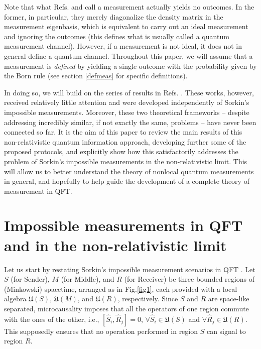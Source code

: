 \documentclass[12pt]{article}
\begin{document}
Note that what Refs. \cite{beckman2001causal} and \cite{fewster2020quantum} call a measurement actually yields no outcomes. In the former, in particular, they merely diagonalize the density matrix in the measurement eigenbasis, which is equivalent to carry out an ideal measurement and ignoring the outcomes (this defines what is usually called a quantum measurement channel). However, if a measurement is not ideal, it does not in general define a quantum channel. Throughout this paper, we will assume that a measurement is \textit{defined} by yielding a single outcome with the probability given by the Born rule (see section \ref{defmeas} for specific definitions).

In doing so, we will build on the series of results in Refs. \cite{aharonov1986measurement, popescu1994causality, groisman2001nonlocal, groisman2002measurements, vaidman2003instantaneous}. These works,  however, received relatively little attention and were developed independently of Sorkin's impossible measurements. Moreover, these two theoretical frameworks -- despite addressing incredibly similar, if not exactly the same, problems -- have never been connected so far.
It is the aim of this paper to review the main results of this non-relativistic quantum information approach, developing further some of the proposed protocols, and  explicitly show how this satisfactorily addresses the problem of Sorkin's impossible measurements in the non-relativistic limit. This will allow us to better understand the theory of nonlocal quantum measurements in general, and hopefully to help guide the development of a complete theory of measurement in QFT. 







\section{Impossible measurements in QFT and in the non-relativistic limit}
\label{imp}



Let us start by restating Sorkin's impossible measurement scenarios in QFT \cite{sorkin1993impossible}. Let $S$ (for Sender), $M$ (for Middle), and $R$ (for Receiver) be three bounded regions of (Minkowski)  spacetime, arranged as in Fig.\ref{fig1}, each provided with a local algebra     $\mathfrak{U}(S)$,     $\mathfrak{U}(M)$, and     $\mathfrak{U}(R)$, respectively. Since $S$ and $R$ are space-like separated, microcausality imposes that all the operators of one region commute with the ones of the other, i.e., $[\hat S_i,\hat R_j]=0$, $\forall \hat S_i\in \mathfrak{U}(S)$ and $\forall \hat R_j \in \mathfrak{U}(R)$. This supposedly ensures that no operation performed in region $S$ can signal to region $R$. 
\end{document}
